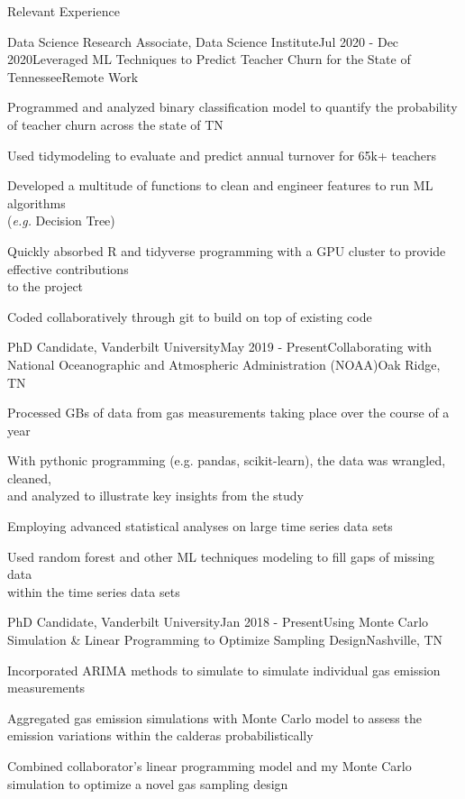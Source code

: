 \documentclass{resume} %
\begin{document}
\begin{rSection}{Relevant Experience}

\begin{rSubsection}{Data Science Research Associate, Data Science Institute}{Jul 2020 - Dec 2020}{Leveraged ML Techniques to Predict Teacher Churn for the State of Tennessee}{Remote Work} 
\item {Programmed and analyzed binary classification model to quantify the probability \\ of teacher churn across the state of TN}
\item {Used tidymodeling to evaluate and predict annual turnover for 65k+ teachers}
\item {Developed a multitude of functions to clean and engineer features to run ML algorithms \\ (\emph{e.g.} Decision Tree)}
\item {Quickly absorbed R and tidyverse programming with a GPU cluster to provide effective contributions \\ to the project}
\item {Coded collaboratively through git to build on top of existing code}

\end{rSubsection} 


\begin{rSubsection}{PhD Candidate, Vanderbilt University}{May 2019 - Present}{Collaborating with National Oceanographic and Atmospheric Administration (NOAA)}{Oak Ridge, TN}
\item {Processed GBs of data from gas measurements taking place over the course of a year}
\item {With pythonic programming (e.g. pandas, scikit-learn), the data was wrangled, cleaned, \\ and analyzed to illustrate key insights from the study}
\item {Employing advanced statistical analyses on large time series data sets}
\item {Used random forest and other ML techniques modeling to fill gaps of missing data \\ within the time series data sets}

\end{rSubsection}


\begin{rSubsection}{PhD Candidate, Vanderbilt University}{Jan 2018 - Present}{Using Monte Carlo Simulation \& Linear Programming to Optimize Sampling Design}{Nashville, TN}
\item {Incorporated ARIMA methods to simulate to simulate individual gas emission measurements}
\item {Aggregated gas emission simulations with Monte Carlo model to assess the emission variations within the calderas probabilistically}
\item {Combined collaborator's linear programming model and my Monte Carlo simulation to optimize a novel gas sampling design}


\end{rSubsection}
\end{rSection}
\end{document}
